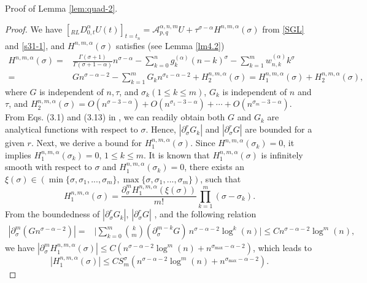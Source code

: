 \documentclass[10pt]{siamltex}
\newcommand{\px}[1][x]{\partial_{#1}}
\begin{document}
Proof of Lemma \ref{lem:quad-2}.
\begin{proof}
We have
$\left[{}_{RL}D_{0,t}^{\alpha}U(t)\right]_{t=t_n}=\mathcal{A}_{p,q}^{\alpha,n,m}U
+\tau^{\sigma-\alpha}H^{n,m,\alpha}(\sigma)$
from \eqref{SGL} and \eqref{s31-1},
%
and $H^{n,m,\alpha}(\sigma)$  satisfies (see Lemma \ref{lm4.2})
\begin{equation*} \begin{aligned}
H^{n,m,\alpha}(\sigma)=&\frac{\Gamma(\sigma+1)}{\Gamma(\sigma+1-\alpha)}n^{\sigma-\alpha}
-\sum_{k=0}^{n}g^{(\alpha)}_{k}(n-k)^{\sigma} -\sum_{k=1}^mw_{n,k}^{(\alpha)}k^{\sigma}\\
=&Gn^{\sigma-\alpha-2}-\sum_{k=1}^mG_kn^{\sigma_k-\alpha-2}
+{H}_2^{n,m,\alpha}(\sigma)={H}_1^{n,m,\alpha}(\sigma)+{H}_2^{n,m,\alpha}(\sigma),
\end{aligned}\end{equation*}
where $G$ is independent of $n,\tau$, and $\sigma_k(1\leq k \leq m)$,  $G_k$ is independent of $n$ and $\tau$,   and ${H}_2^{n,m,\alpha}(\sigma)=O({n}^{\sigma-3-\alpha})
+O({n}^{\sigma_1-3-\alpha})+\cdots + O({n}^{\sigma_m-3-\alpha})$. From  Eqs. (3.1) and (3.13) in \cite{Lub86}, we can readily obtain both $G$ and $G_k$ are analytical functions with respect to $\sigma$.
Hence, $|\px[\sigma]^rG_k|$ and $|\px[\sigma]^rG|$ are bounded for a given $r$.
Next, we derive a bound for
${H}_1^{n,m,\alpha}(\sigma)$. Since $H^{n,m,\alpha}(\sigma_k)=0$, it implies
${H}_1^{n,m,\alpha}(\sigma_k)=0$, $1\leq k \leq m$. It is known that ${H}_1^{n,m,\alpha}(\sigma)$ is infinitely smooth with respect to $\sigma$ and ${H}_1^{n,m,\alpha}(\sigma_k)=0$, there exists an $\xi(\sigma)\in(\min\{\sigma,\sigma_1,...,\sigma_m\},\max\{\sigma,\sigma_1,...,\sigma_m\})$,
such that
$${H}_1^{n,m,\alpha}(\sigma)=\frac{\px[\sigma]^{m}{H}_1^{n,m,\alpha}(\xi(\sigma))}{m!}
\prod_{k=1}^m(\sigma-\sigma_k).$$
From the boundedness of $|\px[\sigma]^r G_k|$, $|\px[\sigma]^r G|$ , and the following relation
\begin{equation*} \begin{aligned}
|\px[\sigma]^{m} (Gn^{\sigma-\alpha-2})|
=&\bigg|\sum_{k=0}^m\binom{k}{m}(\px[\sigma]^{m-k}G)\, n^{\sigma-\alpha-2}\log^{k}(n)\bigg|
\leq Cn^{\sigma-\alpha-2}\log^{m}(n),
\end{aligned}\end{equation*}
we have
$|\px[\sigma]^{m}{H}_1^{n,m,\alpha}(\sigma)|
\leq C\left(n^{\sigma-\alpha-2}\log^{m}(n)
+n^{\sigma_{\max}-\alpha-2}\right)$, which leads to
$$|{H}_1^{n,m,\alpha}(\sigma)|\leq CS_m^{\sigma}\left(n^{\sigma-\alpha-2}\log^{m}(n)
+n^{\sigma_{\max}-\alpha-2}\right).$$


\end{proof}
\end{document}
